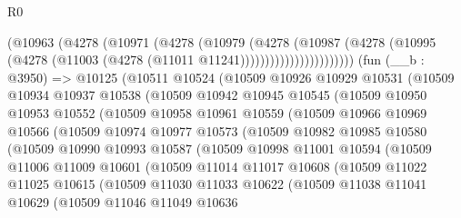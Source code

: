 \begin{lexlean}{R0}
\begin{coremodule}
                        (@10963
                          (@4278
                            (@10971
                              (@4278
                                (@10979
                                  (@4278
                                    (@10987
                                      (@4278
                                        (@10995
                                          (@4278
                                            (@11003 (@4278 (@11011 @11241)))))))))))))))))))))))
    (fun (__b : @3950) =>
    @10125
      (@10511
        @10524
        (@10509
          @10926
          @10929
          @10531
          (@10509
            @10934
            @10937
            @10538
            (@10509
              @10942
              @10945
              @10545
              (@10509
                @10950
                @10953
                @10552
                (@10509
                  @10958
                  @10961
                  @10559
                  (@10509
                    @10966
                    @10969
                    @10566
                    (@10509
                      @10974
                      @10977
                      @10573
                      (@10509
                        @10982
                        @10985
                        @10580
                        (@10509
                          @10990
                          @10993
                          @10587
                          (@10509
                            @10998
                            @11001
                            @10594
                            (@10509
                              @11006
                              @11009
                              @10601
                              (@10509
                                @11014
                                @11017
                                @10608
                                (@10509
                                  @11022
                                  @11025
                                  @10615
                                  (@10509
                                    @11030
                                    @11033
                                    @10622
                                    (@10509
                                      @11038
                                      @11041
                                      @10629
                                      (@10509
                                        @11046
                                        @11049
                                        @10636

\end{coremodule}
\end{lexlean}
